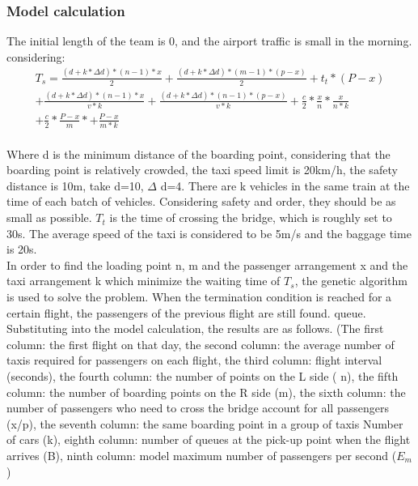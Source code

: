 \subsubsection{Model calculation}
The initial length of the team is 0, and the airport traffic is small in the morning.
considering:
\begin{equation}\begin{split} T_{s} = \frac{{(d+k*\Delta d)}*{(n-1)}*{x}}{2}+\frac{{(d+k*\Delta d)}*{(m-1)}*{(p-x)}}{2}+t_t*(P-x)\\+\frac{{(d+k*\Delta d)}*{(n-1)}*x}{v*k}+\frac{{(d+k*\Delta d)}*{(n-1)}*(p-x)}{v*k}+\frac{c}{2}*\frac{x}{n}*\frac{x}{n*k}\\+\frac{c}{2}*\frac{P-x}{m}*+\frac{P-x}{m*k}\end{split}\end{equation}\\
\indent Where d is the minimum distance of the boarding point, considering that the boarding point is relatively crowded, the taxi speed limit is 20km/h, the safety distance is 10m, take d=10, $\Delta$ d=4. There are k vehicles in the same train at the time of each batch of vehicles. Considering safety and order, they should be as small as possible. $T_t$ is the time of crossing the bridge, which is roughly set to 30s. The average speed of the taxi is considered to be 5m/s and the baggage time is 20s.\\
\indent In order to find the loading point n, m and the passenger arrangement x and the taxi arrangement k which minimize the waiting time of $T_s$, the genetic algorithm\cite{dombry2007weighted} is used to solve the problem. When the termination condition is reached for a certain flight, the passengers of the previous flight are still found. queue.\\
\indent Substituting into the model calculation, the results are as follows. (The first column: the first flight on that day, the second column: the average number of taxis required for passengers on each flight, the third column: flight interval (seconds), the fourth column: the number of points on the L side ( n), the fifth column: the number of boarding points on the R side (m), the sixth column: the number of passengers who need to cross the bridge account for all passengers (x/p), the seventh column: the same boarding point in a group of taxis Number of cars (k), eighth column: number of queues at the pick-up point when the flight arrives (B), ninth column: model maximum number of passengers per second ($E_m$)

